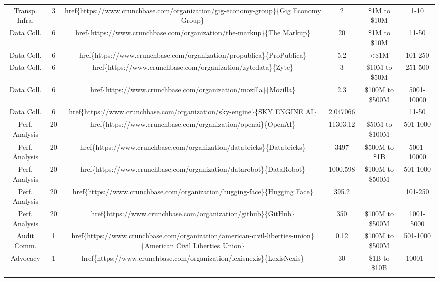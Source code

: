 \begin{table}[!htbp]
\begin{tabular}{@{\extracolsep{5pt}} cccccc}
Transp. Infra. & 3 & href\{https://www.crunchbase.com/organization/gig-economy-group\}\{Gig Economy Group\} & 2 & \$1M to \$10M & 1-10 \\ 
Data Coll. & 6 & href\{https://www.crunchbase.com/organization/the-markup\}\{The Markup\} & 20 & \$1M to \$10M & 11-50 \\ 
Data Coll. & 6 & href\{https://www.crunchbase.com/organization/propublica\}\{ProPublica\} & 5.2 & \textless \$1M & 101-250 \\ 
Data Coll. & 6 & href\{https://www.crunchbase.com/organization/zytedata\}\{Zyte\} & 3 & \$10M to \$50M & 251-500 \\ 
Data Coll. & 6 & href\{https://www.crunchbase.com/organization/mozilla\}\{Mozilla\} & 2.3 & \$100M to \$500M & 5001-10000 \\ 
Data Coll. & 6 & href\{https://www.crunchbase.com/organization/sky-engine\}\{SKY ENGINE AI\} & 2.047066 &  & 11-50 \\ 
Perf. Analysis & 20 & href\{https://www.crunchbase.com/organization/openai\}\{OpenAI\} & 11303.12 & \$50M to \$100M & 501-1000 \\ 
Perf. Analysis & 20 & href\{https://www.crunchbase.com/organization/databricks\}\{Databricks\} & 3497 & \$500M to \$1B & 5001-10000 \\ 
Perf. Analysis & 20 & href\{https://www.crunchbase.com/organization/datarobot\}\{DataRobot\} & 1000.598 & \$100M to \$500M & 501-1000 \\ 
Perf. Analysis & 20 & href\{https://www.crunchbase.com/organization/hugging-face\}\{Hugging Face\} & 395.2 &  & 101-250 \\ 
Perf. Analysis & 20 & href\{https://www.crunchbase.com/organization/github\}\{GitHub\} & 350 & \$100M to \$500M & 1001-5000 \\ 
Audit Comm. & 1 & href\{https://www.crunchbase.com/organization/american-civil-liberties-union\}\{American Civil Liberties Union\} & 0.12 & \$100M to \$500M & 501-1000 \\ 
Advocacy & 1 & href\{https://www.crunchbase.com/organization/lexisnexis\}\{LexisNexis\} & 30 & \$1B to \$10B & 10001+ \\ 
\hline \\[-1.8ex] 
\end{tabular} 
\end{table} 

